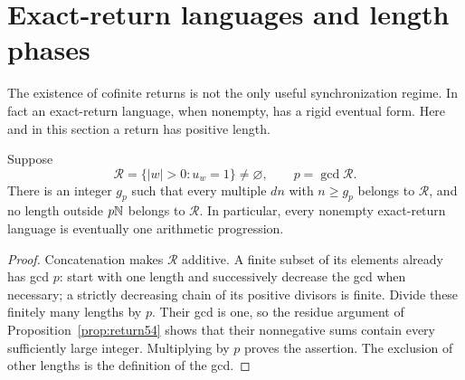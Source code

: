 \section{Exact-return languages and length phases}\label{sec:phases55}
The existence of cofinite returns is not the only useful synchronization regime. In fact an exact-return language, when nonempty, has a rigid eventual form. Here and in this section a return has positive length.

\begin{lemma}\label{lem:returnperiod55}
Suppose
\[
 \mathcal R=\{|w|>0:u_w=1\}\ne\varnothing,
 \qquad p=\gcd\mathcal R.
\]
There is an integer $g_p$ such that every multiple $dn$ with $n\ge g_p$ belongs to $\mathcal R$, and no length outside $p\mathbb N$ belongs to $\mathcal R$. In particular, every nonempty exact-return language is eventually one arithmetic progression.
\end{lemma}
\begin{proof}
Concatenation makes $\mathcal R$ additive. A finite subset of its elements already has gcd $p$: start with one length and successively decrease the gcd when necessary; a strictly decreasing chain of its positive divisors is finite. Divide these finitely many lengths by $p$. Their gcd is one, so the residue argument of Proposition~\ref{prop:return54} shows that their nonnegative sums contain every sufficiently large integer. Multiplying by $p$ proves the assertion. The exclusion of other lengths is the definition of the gcd.
\end{proof}

